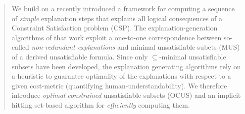 \documentclass{llncs}
\begin{document}
\begin{abstract}
	We build on a recently introduced a framework for computing a sequence of \emph{simple} explanation steps that explains all logical consequences of a Constraint Satisfaction problem (CSP). 
	The explanation-generation algorithms of that work exploit a one-to-one correspondence between so-called \emph{non-redundant explanations} and minimal unsatisfiable subets (MUS) of a derived unsatisfiable formula.	
	Since only $\subseteq$-minimal unsatisfiable subsets have been developed, the explanation generating algorithms rely on a heuristic to guarantee optimality of the explanations with respect to a given cost-metric (quantifying human-understandability).
	We therefore introduce \emph{optimal} \emph{constrained} unsatisfiable subsets (OCUS) and an implicit hitting set-based algorithm for \emph{efficiently} computing them. 
%
%
%
%
%
%
%
%
%
%

\end{abstract}
\end{document}
